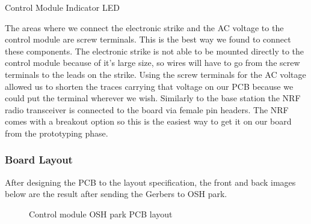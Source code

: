 {Control Module Indicator LED}

The areas where we connect the electronic strike and the AC
voltage to the control module are screw terminals. This is the best way
we found to connect these components. The electronic strike is not able
to be mounted directly to the control module because of it{}'s large size, so
wires will have to go from the screw terminals to the leads on the strike.
Using the screw terminals for the AC voltage allowed us to shorten the traces
carrying that voltage on our PCB because we could put the terminal wherever we
wish. Similarly to the base station the NRF radio transceiver is
connected to the board via female pin headers. The NRF comes with a breakout
option so this is the easiest way to get it on our board from the
prototyping phase.

\subsubsection{Board Layout}
After designing the PCB to the layout specification, the front and back images below are the result after sending the Gerbers to OSH park.

\begin{figure}[H]
\caption{Control module OSH park PCB layout}
\label{fig:control-module-pcb}
\end{figure}
